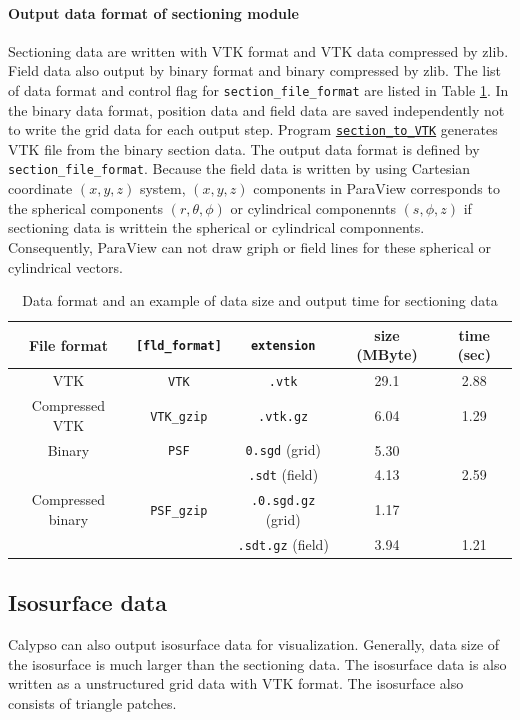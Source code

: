 \paragraph{Output data format of sectioning module}
\label{sec:PSF_data}
Sectioning data are written with VTK format and VTK data compressed by zlib. Field data also output by binary format and binary compressed by zlib. The list of data format and control flag for \verb|section_file_format| are listed in Table \ref{table:PSF_data}. In the binary data format, position data and field data are saved independently not to write the grid data for each output step. Program \hyperref[section:section_to_VTK]{\tt section\_to\_VTK} generates VTK file from the binary section data. The output data format is defined by \verb|section_file_format|. Because the field data is written by using Cartesian coordinate $(x,y,z)$ system, $(x,y,z)$ components in ParaView corresponds to the spherical components $(r, \theta, \phi)$ or cylindrical componennts $(s,\phi, z)$ if sectioning data is writtein the spherical or cylindrical componnents. Consequently, ParaView can not draw griph or field lines for these spherical or cylindrical vectors.
%
\begin{table}[htp]
\caption{Data format  and an example of data size and output time  for sectioning data}
\label{table:PSF_data}
\begin{center} 
\begin{tabular}{|c|c|c|c|c|}
\hline
File format & \verb|[fld_format]| & \verb|extension| & size (MByte) & time (sec)  \\ \hline \hline
VTK & \verb|VTK| & \verb|.vtk| & 29.1 & 2.88 \\ \hline
Compressed VTK & \verb|VTK_gzip| & \verb|.vtk.gz| & 6.04 & 1.29 \\ \hline
Binary & \verb|PSF| & \verb|0.sgd| (grid) & 5.30 &  \\
           &        &  \verb|.sdt| (field) & 4.13 & 2.59 \\ \hline
Compressed binary & \verb|PSF_gzip| & \verb|.0.sgd.gz| (grid) & 1.17 & \\
           &        &  \verb|.sdt.gz| (field) & 3.94 & 1.21 \\ \hline
\end{tabular}
\end{center} 
\end{table} 

%
\subsection{Isosurface data}
\label{section:ISO}
%
Calypso can also output isosurface data for visualization. Generally, data size of the isosurface is much larger than the sectioning data. The isosurface data is also written as a unstructured grid data with VTK format. The isosurface also consists of triangle patches.

